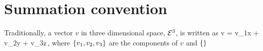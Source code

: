 \section{Summation convention}
Traditionally, a vector $v$ in three dimensional space, $\mathcal{\mathcal{E}}^{3}$, is written as
\beq
v = v_1\hat x + v_2\hat y + v_3\hat z\,,
\eeq
where $\left\lbrace{v_1, v_2, v_3}\right\rbrace$ are the components of $v$ and $\left\lbrace{}\right\rbrace$

